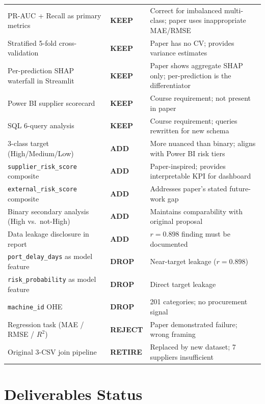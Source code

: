 \documentclass[11pt,a4paper]{article}
\begin{document}
\begin{longtable}{L{5.2cm} L{2.2cm} L{5.8cm}}
PR-AUC + Recall as primary metrics & \textbf{KEEP} & Correct for imbalanced multi-class; paper uses inappropriate MAE/RMSE \\
Stratified 5-fold cross-validation & \textbf{KEEP} & Paper has no CV; provides variance estimates \\
Per-prediction SHAP waterfall in Streamlit & \textbf{KEEP} & Paper shows aggregate SHAP only; per-prediction is the differentiator \\
Power BI supplier scorecard & \textbf{KEEP} & Course requirement; not present in paper \\
SQL 6-query analysis & \textbf{KEEP} & Course requirement; queries rewritten for new schema \\
3-class target (High/Medium/Low) & \textbf{ADD} & More nuanced than binary; aligns with Power BI risk tiers \\
\texttt{supplier\_risk\_score} composite & \textbf{ADD} & Paper-inspired; provides interpretable KPI for dashboard \\
\texttt{external\_risk\_score} composite & \textbf{ADD} & Addresses paper's stated future-work gap \\
Binary secondary analysis (High vs.\ not-High) & \textbf{ADD} & Maintains comparability with original proposal \\
Data leakage disclosure in report & \textbf{ADD} & $r = 0.898$ finding must be documented \\
\texttt{port\_delay\_days} as model feature & \textbf{DROP} & Near-target leakage ($r = 0.898$) \\
\texttt{risk\_probability} as model feature & \textbf{DROP} & Direct target leakage \\
\texttt{machine\_id} OHE & \textbf{DROP} & 201 categories; no procurement signal \\
Regression task (MAE / RMSE / $R^2$) & \textbf{REJECT} & Paper demonstrated failure; wrong framing \\
Original 3-CSV join pipeline & \textbf{RETIRE} & Replaced by new dataset; 7 suppliers insufficient \\
\end{longtable}

\section{Deliverables Status}
\end{document}
